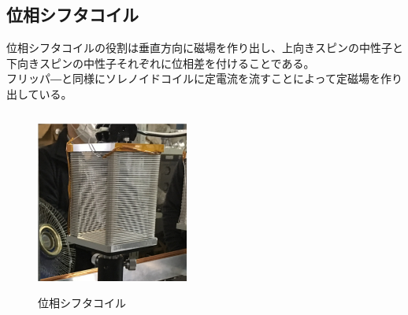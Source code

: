\subsection{位相シフタコイル}
位相シフタコイルの役割は垂直方向に磁場を作り出し、上向きスピンの中性子と下向きスピンの中性子それぞれに位相差を付けることである。\\
フリッパ―と同様にソレノイドコイルに定電流を流すことによって定磁場を作り出している。
\begin{figure}[H]
\begin{center}
\includegraphics[width=5cm,height=6cm]{device/shifterphoto.pdf}\caption{位相シフタコイル}
\end{center}
\end{figure}